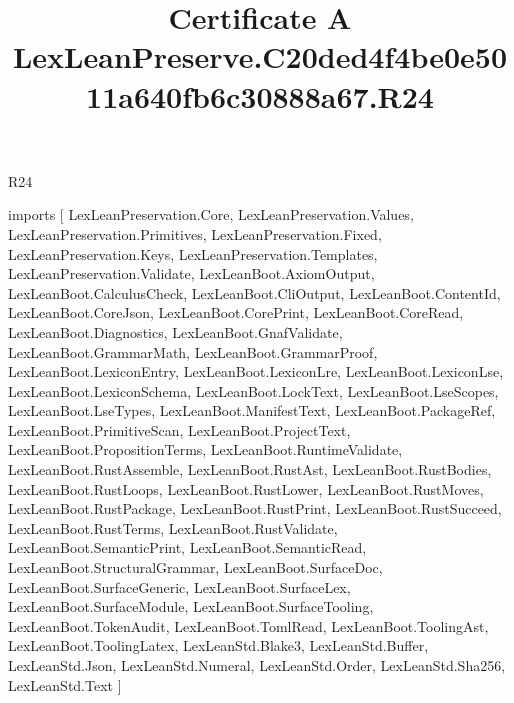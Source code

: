 \begin{lexlean}{R24}
\title{Certificate A LexLeanPreserve.C20ded4f4be0e5011a640fb6c30888a67.R24}
\begin{coremodule}
imports [
  LexLeanPreservation.Core,
  LexLeanPreservation.Values,
  LexLeanPreservation.Primitives,
  LexLeanPreservation.Fixed,
  LexLeanPreservation.Keys,
  LexLeanPreservation.Templates,
  LexLeanPreservation.Validate,
  LexLeanBoot.AxiomOutput,
  LexLeanBoot.CalculusCheck,
  LexLeanBoot.CliOutput,
  LexLeanBoot.ContentId,
  LexLeanBoot.CoreJson,
  LexLeanBoot.CorePrint,
  LexLeanBoot.CoreRead,
  LexLeanBoot.Diagnostics,
  LexLeanBoot.GnafValidate,
  LexLeanBoot.GrammarMath,
  LexLeanBoot.GrammarProof,
  LexLeanBoot.LexiconEntry,
  LexLeanBoot.LexiconLre,
  LexLeanBoot.LexiconLse,
  LexLeanBoot.LexiconSchema,
  LexLeanBoot.LockText,
  LexLeanBoot.LseScopes,
  LexLeanBoot.LseTypes,
  LexLeanBoot.ManifestText,
  LexLeanBoot.PackageRef,
  LexLeanBoot.PrimitiveScan,
  LexLeanBoot.ProjectText,
  LexLeanBoot.PropositionTerms,
  LexLeanBoot.RuntimeValidate,
  LexLeanBoot.RustAssemble,
  LexLeanBoot.RustAst,
  LexLeanBoot.RustBodies,
  LexLeanBoot.RustLoops,
  LexLeanBoot.RustLower,
  LexLeanBoot.RustMoves,
  LexLeanBoot.RustPackage,
  LexLeanBoot.RustPrint,
  LexLeanBoot.RustSucceed,
  LexLeanBoot.RustTerms,
  LexLeanBoot.RustValidate,
  LexLeanBoot.SemanticPrint,
  LexLeanBoot.SemanticRead,
  LexLeanBoot.StructuralGrammar,
  LexLeanBoot.SurfaceDoc,
  LexLeanBoot.SurfaceGeneric,
  LexLeanBoot.SurfaceLex,
  LexLeanBoot.SurfaceModule,
  LexLeanBoot.SurfaceTooling,
  LexLeanBoot.TokenAudit,
  LexLeanBoot.TomlRead,
  LexLeanBoot.ToolingAst,
  LexLeanBoot.ToolingLatex,
  LexLeanStd.Blake3,
  LexLeanStd.Buffer,
  LexLeanStd.Json,
  LexLeanStd.Numeral,
  LexLeanStd.Order,
  LexLeanStd.Sha256,
  LexLeanStd.Text
]


\end{coremodule}
\end{lexlean}
